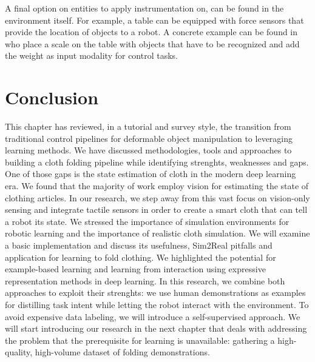 \documentclass[\home/main.tex]{subfiles}
\begin{document}
A final option on entities to apply instrumentation on, can be found in the environment itself. For example, a table can be equipped with force sensors that provide the location of objects to a robot. A concrete example can be found in \autocite{Kimura2013} who place a scale on the table with objects that have to be recognized and add the weight as input modality for control tasks. 
	
\section{Conclusion}

% 	

This chapter has reviewed, in a tutorial and survey style, the transition from traditional control pipelines for deformable object manipulation to leveraging learning methods. We have discussed methodologies, tools and approaches to building a cloth folding pipeline while identifying strenghts, weaknesses and gaps. 
One of those gaps is the state estimation of cloth in the modern deep learning era. We found that the majority of work employ vision for estimating the state of clothing articles. In our research, we step away from this vast focus on vision-only sensing and integrate tactile sensors in order to create a smart cloth that can tell a robot its state. 
We stressed the importance of simulation environments for robotic learning and the importance of realistic cloth simulation. We will examine a basic implementation and discuss its usefulness, Sim2Real pitfalls and application for learning to fold clothing.  
We highlighted the potential for example-based learning and learning from interaction using expressive representation methods in deep learning. In this research, we combine both approaches to exploit their strenghts: we use human demonstrations as examples for distilling task intent while letting the robot interact with the environment. To avoid expensive data labeling, we will introduce a self-supervised approach. 
We will start introducing our research in the next chapter that deals with addressing the problem that the prerequisite for learning is unavailable: gathering a high-quality, high-volume dataset of folding demonstrations. 

\end{document}
